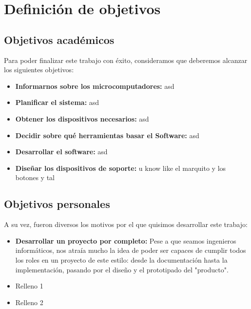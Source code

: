 \chapter{Definici\'on de objetivos}\label{defobjetivos}
	
\section{Objetivos acad\'emicos}\label{sec:obj_ac}
Para poder finalizar este trabajo con éxito, consideramos que deberemos alcanzar los siguientes objetivos:
\begin{itemize}
\item \textbf{Informarnos sobre los microcomputadores:} asd
\item \textbf{Planificar el sistema:} asd
\item \textbf{Obtener los dispositivos necesarios:} asd
\item \textbf{Decidir sobre qué herramientas basar el Software:} asd
\item \textbf{Desarrollar el software:} asd
\item \textbf{Diseñar los dispositivos de soporte:} u know like el marquito y los botones y tal
\end{itemize} 

\section{Objetivos personales}\label{sec:obj_per}
A su vez, fueron diversos los motivos por el que quisimos desarrollar este trabajo:
\begin{itemize}
\item \textbf{Desarrollar un proyecto por completo:} Pese a que seamos ingenieros inform\'aticos, nos atra\'ia mucho la idea de poder ser capaces de cumplir todos los roles en un proyecto de este estilo: desde la documentaci\'on hasta la implementaci\'on, pasando por el dise\~{n}o y el prototipado del "producto".
\item Relleno 1
\item Relleno 2
\end{itemize} 